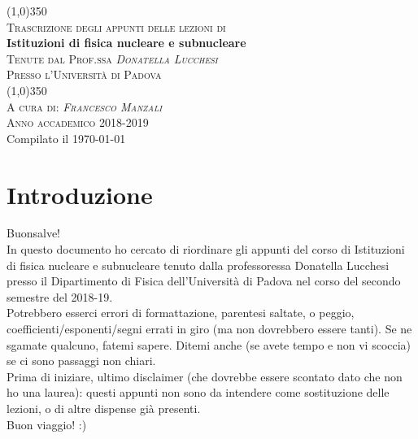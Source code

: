 \documentclass[12pt]{report} %
\makeatletter
\theoremstyle{plain}
\theoremstyle{definition}
\renewcommand{\@marginparreset}{%
  \reset@font\small
  \raggedright
  \slshape
  \@setminipage
}
\makeatother
\begin{document}

\begin{center}
                \line (1,0){350} \\
                \textsc{\normalsize Trascrizione degli appunti delle lezioni di}\\
                [0.25in]
                \huge{\bfseries Istituzioni di fisica nucleare e subnucleare}\\
                [2mm]
                \textsc{\normalsize Tenute dal Prof.ssa \textit{Donatella Lucchesi}}
                \vspace{-0.5em}\\
                \textsc{\normalsize Presso l'Università di Padova}\\
                \vspace{-1em}
                \line (1,0){350} \\
        [0.2cm]
        \textsc{\normalsize A cura di: \textit{Francesco Manzali}}\\
                \textsc{\normalsize Anno accademico 2018-2019}\\ 
        {\scriptsize Compilato il \today}
\end{center}



\makeatletter
\renewcommand{\@marginparreset}{%
  \reset@font\small
  \raggedright
  \slshape
  \@setminipage
}
\makeatother

\tableofcontents 
\clearpage
\chapter*{Introduzione}
Buonsalve!\\
In questo documento ho cercato di riordinare gli appunti del corso di Istituzioni di fisica nucleare e subnucleare tenuto dalla professoressa Donatella Lucchesi presso il Dipartimento di Fisica dell'Università di Padova nel corso del secondo semestre del 2018-19.\\
Potrebbero esserci errori di formattazione, parentesi saltate, o peggio, coefficienti/esponenti/segni errati in giro (ma non dovrebbero essere tanti). Se ne sgamate qualcuno, fatemi sapere. Ditemi anche (se avete tempo e non vi scoccia) se ci sono passaggi non chiari.\\
Prima di iniziare, ultimo disclaimer (che dovrebbe essere scontato dato che non ho una laurea): questi appunti non sono da intendere come sostituzione delle lezioni, o di altre dispense già presenti.\\
Buon viaggio! :)
\end{document}
